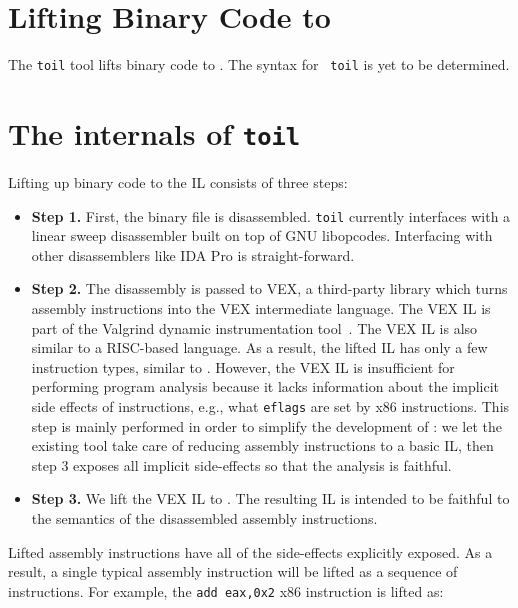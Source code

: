 \section{Lifting Binary Code to \bil}

The {\tt toil} tool lifts binary code to \bil.  The syntax for {\tt
  toil} is yet to be determined.


\section{The internals of {\tt toil}}
Lifting up binary code to the IL consists of three steps:
\begin{itemize}\squish
\item {\bf Step 1.} First, the binary file is disassembled. {\tt toil}
  currently interfaces with %
  a linear sweep disassembler built on top of GNU libopcodes.
  Interfacing with other disassemblers like IDA Pro is straight-forward.

\item {\bf Step 2.} The disassembly is passed to VEX, a third-party
  library which turns assembly instructions into the VEX intermediate
  language. The VEX IL is part of the Valgrind dynamic instrumentation
  tool~\cite{nethercote:2004:phd}.  The VEX IL is also similar to a
  RISC-based language. As a result, the lifted IL has only a few
  instruction types, similar to \bap. However, the VEX IL  is
  insufficient for performing program analysis because it lacks
  information about the implicit side effects of instructions, e.g., what
  {\tt eflags} are set by x86 instructions.  This step is mainly
  performed in order to simplify the development of \bap: we let the
  existing tool take care of reducing assembly instructions to a
  basic IL, then step 3 exposes all implicit side-effects so that
  the analysis is faithful.

  

\item {\bf Step 3.} We lift the VEX IL to \bil.  The resulting \bil
  IL is intended to be faithful to the semantics of the disassembled
  assembly instructions. 
\end{itemize}

Lifted assembly instructions have all of the side-effects explicitly
exposed.  As a result, a single typical assembly instruction will be
lifted as a sequence of \bil instructions.  For example, the {\tt add
  eax,0x2} x86 instruction is lifted as:

